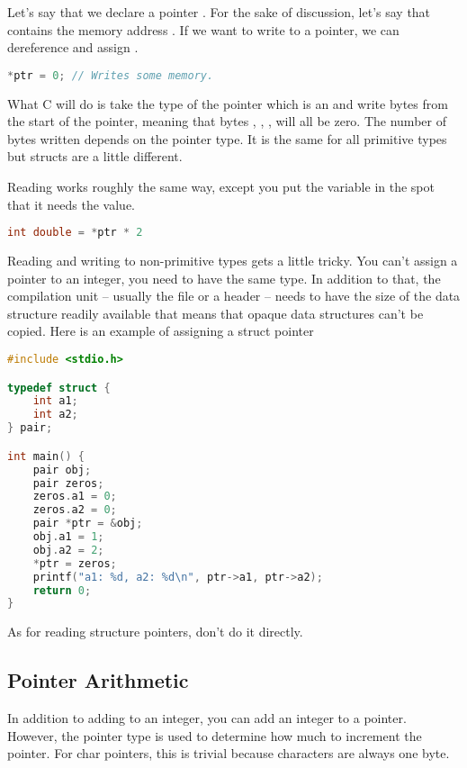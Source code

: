 Let's say that we declare a pointer . For the sake of discussion, let's say that  contains the memory address .
If we want to write to a pointer, we can dereference and assign .

\begin{lstlisting}[language=C]
*ptr = 0; // Writes some memory.
\end{lstlisting}

What C will do is take the type of the pointer which is an  and write  bytes from the start of the pointer, meaning that bytes , , ,  will all be zero.
The number of bytes written depends on the pointer type.
It is the same for all primitive types but structs are a little different.

Reading works roughly the same way, except you put the variable in the spot that it needs the value.

\begin{lstlisting}[language=C]
  int double = *ptr * 2
\end{lstlisting}

Reading and writing to non-primitive types gets a little tricky.
You can't assign a pointer to an integer, you need to have the same type.
In addition to that, the compilation unit -- usually the file or a header -- needs to have the size of the data structure readily available that means that opaque data structures can't be copied.
Here is an example of assigning a struct pointer

\begin{lstlisting}[language=C]
#include <stdio.h>

typedef struct {
    int a1;
    int a2;
} pair;

int main() {
    pair obj;
    pair zeros;
    zeros.a1 = 0;
    zeros.a2 = 0;
    pair *ptr = &obj;
    obj.a1 = 1;
    obj.a2 = 2;
    *ptr = zeros;
    printf("a1: %d, a2: %d\n", ptr->a1, ptr->a2);
    return 0;
}
\end{lstlisting}

As for reading structure pointers, don't do it directly.

\subsection{Pointer Arithmetic}

In addition to adding to an integer, you can add an integer to a pointer.
However, the pointer type is used to determine how much to increment the pointer.
For char pointers, this is trivial because characters are always one byte.

